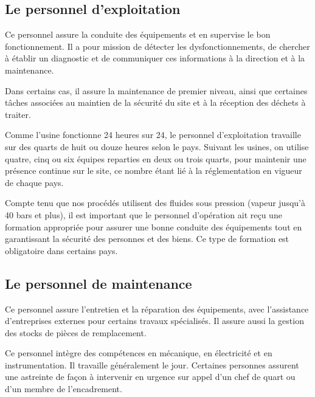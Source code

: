  
\subsection{Le personnel d’exploitation } 

Ce personnel assure la conduite des équipements et en supervise le bon fonctionnement.
Il a pour mission de détecter les dysfonctionnements, de chercher à établir un diagnostic et 
de communiquer ces informations à la direction et à la maintenance. 

\vspace{0.3cm} 

Dans certains cas, il assure la maintenance de premier niveau, ainsi que certaines tâches associées au maintien de la sécurité du site et à la réception des déchets à traiter.
\vspace{0.3cm} 

Comme l’usine fonctionne 24 heures sur 24, le personnel d’exploitation travaille sur des quarts de huit ou douze heures selon le pays. Suivant les usines, on utilise quatre, cinq ou six équipes reparties en deux ou trois quarts, pour maintenir une présence continue sur le site, ce nombre étant lié à la réglementation en vigueur de chaque pays.


Compte tenu que nos procédés utilisent des fluides sous pression (vapeur jusqu’à 40 bars et plus), il est important que le personnel d’opération ait reçu une formation appropriée pour assurer une bonne conduite des équipements tout en garantissant la sécurité des personnes et des biens. Ce type de formation est obligatoire dans certains pays.



\subsection{Le personnel de maintenance }



Ce personnel assure l’entretien et la réparation des équipements, avec l’assistance d’entreprises externes pour certains travaux spécialisés. Il assure aussi la gestion des stocks de pièces de remplacement.
\vspace{0.3cm} 

Ce personnel intègre des compétences en mécanique, en électricité et en instrumentation. Il travaille généralement le jour. Certaines personnes assurent une astreinte de façon à intervenir en urgence sur appel d’un chef de quart ou d’un membre de l’encadrement.



